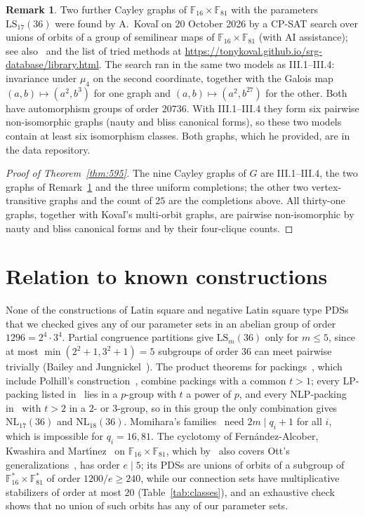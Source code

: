 \documentclass[11pt]{amsart}
\theoremstyle{definition}
\newtheorem{remark}[theorem]{Remark}
\newcommand{\F}{\mathbb{F}}
\newcommand{\LS}{\mathrm{LS}}
\newcommand{\NL}{\mathrm{NL}}
\begin{document}
\begin{remark}\label{rem:koval595}
Two further Cayley graphs of $\F_{16}\times\F_{81}$ with the parameters $\LS_{17}(36)$ were found by A.~Kova\v{l} on 20 October 2026 by a CP-SAT search over unions of orbits of a group of semilinear maps of $\F_{16}\times\F_{81}$ (with AI assistance); see also~\cite{BrouwerTable} and the list of tried methods at \url{https://tonykoval.github.io/srg-database/library.html}. The search ran in the same two models as III.1--III.4: invariance under $\mu_4$ on the second coordinate, together with the Galois map $(a,b)\mapsto(a^2,b^3)$ for one graph and $(a,b)\mapsto(a^2,b^{27})$ for the other. Both have automorphism groups of order $20736$. With III.1--III.4 they form six pairwise non-isomorphic graphs (nauty and bliss canonical forms), so these two models contain at least six isomorphism classes. Both graphs, which he provided, are in the data repository.
\end{remark}

\begin{proof}[Proof of Theorem~\ref{thm:595}]
The nine Cayley graphs of $G$ are III.1--III.4, the two graphs of Remark~\ref{rem:koval595} and the three uniform completions; the other two vertex-transitive graphs and the count of $25$ are the completions above. All thirty-one graphs, together with Kova\v{l}'s multi-orbit graphs, are pairwise non-isomorphic by nauty and bliss canonical forms and by their four-clique counts.
\end{proof}

\section{Relation to known constructions}\label{sec:known}
None of the constructions of Latin square and negative Latin square type PDSs that we checked gives any of our parameter sets in an abelian group of order $1296=2^4\cdot3^4$. Partial congruence partitions give $\LS_m(36)$ only for $m\le5$, since at most $\min(2^2+1,3^2+1)=5$ subgroups of order $36$ can meet pairwise trivially (Bailey and Jungnickel~\cite[Theorem~2.4]{Ma1994}). The product theorems for packings~\cite[Theorems 3.15, 6.8]{JedwabLi2021}, which include Polhill's construction~\cite{Polhill2008}, combine packings with a common $t>1$; every LP-packing listed in~\cite[Table~1.1]{JedwabLi2021} lies in a $p$-group with $t$ a power of $p$, and every NLP-packing in~\cite[Table~1.2]{JedwabLi2021} with $t>2$ in a $2$- or $3$-group, so in this group the only combination gives $\NL_{17}(36)$ and $\NL_{18}(36)$. Momihara's families~\cite[Theorems 1.4, 1.5]{Momihara2021} need $2m\mid q_i+1$ for all $i$, which is impossible for $q_i=16,81$. The cyclotomy of Fern\'andez-Alcober, Kwashira and Mart\'\i nez~\cite{FKM2010} on $\F_{16}\times\F_{81}$, which by~\cite[Section~1]{Ott2016b} also covers Ott's generalizations~\cite{Ott2016b,Ott2016a}, has order $e\mid5$; its PDSs are unions of orbits of a subgroup of $\F_{16}^*\times\F_{81}^*$ of order $1200/e\ge240$, while our connection sets have multiplicative stabilizers of order at most $20$ (Table~\ref{tab:classes}), and an exhaustive check shows that no union of such orbits has any of our parameter sets.
\end{document}
